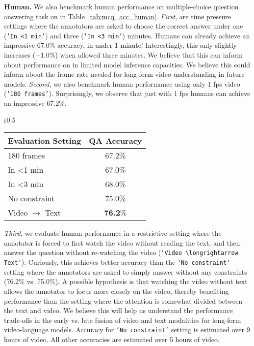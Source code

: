 \noindent\textbf{Human.} We also benchmark human performance on multiple-choice question answering task on\name{}{} in Table~\ref{tab:mcq_acc_human}. \textit{First}, are time pressure settings where the annotators are asked to choose the correct answer under one (\texttt{`In <1 min'}) and three (\texttt{`In <3 min'}) minutes. Humans can already achieve an impressive 67.0\% accuracy, in under 1 minute! Interestingly, this only slightly increases (+1.0\%) when allowed three minutes. We believe that this can inform about performance on\name{}{} in limited model inference capacities. We believe this could inform about the frame rate needed for long-form video understanding in future models. \textit{Second}, we also benchmark human performance using only 1 fps video (\texttt{`180 frames'}). Surprisingly, we observe that just with 1 fps humans can achieve an impressive 67.2\%. \setlength{\columnsep}{5pt}
\setlength{\intextsep}{5pt}
\begin{wrapfigure}{r}{0.5\textwidth}
\centering
\caption{\textbf{Human Accuracy on \name{}{}} }
\begin{tabular}{l|c}
Evaluation Setting & QA Accuracy \\
\toprule
180 frames          &  67.2\%\\
\midrule
In <1 min          &  67.0\%\\
In <3 min     &  68.0\%\\
\midrule
No constraint       &  75.0\%\\
\rowcolor{baselinecolor}
Video $\rightarrow$ Text         &  \textbf{76.2}\%\\
\bottomrule
\end{tabular}%
\label{tab:mcq_acc_human}
\end{wrapfigure}
\textit{Third}, we evaluate human performance in a restrictive setting where the annotator is forced to first watch the video without reading the text, and then answer the question without re-watching the video (\texttt{`Video $\longrightarrow$ Text'}). Curiously, this achieves better accuracy than the \texttt{`No constraint'} setting where the annotators are asked to simply answer without any constraints (76.2\% vs. 75.0\%). A possible hypothesis is that watching the video without text allows the annotator to focus more closely on the video, thereby benefiting performance than the setting where the attention is somewhat divided between the text and video. We believe this will help us understand the performance trade-offs in the early vs. late fusion of video and text modalities for long-form video-language models. Accuracy for \texttt{`No constraint'} setting is estimated over 9 hours of video. All other accuracies are estimated over 5 hours of video.

